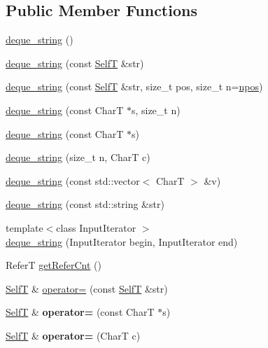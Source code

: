 \subsection*{Public Member Functions}
\begin{CompactItemize}
\item 
\hyperlink{classdeque__string_58a95023c19819f6bbc152a5a764be24}{deque\_\-string} ()
\item 
\hyperlink{classdeque__string_370593eb79336a2b06b0110eb6341807}{deque\_\-string} (const \hyperlink{classdeque__string}{SelfT} \&str)
\item 
\hyperlink{classdeque__string_bdf7279246355a4f6f20fa2f977ea581}{deque\_\-string} (const \hyperlink{classdeque__string}{SelfT} \&str, size\_\-t pos, size\_\-t n=\hyperlink{classdeque__string_b2a5692bbdd473486ce93df0cadd2540}{npos})
\item 
\hyperlink{classdeque__string_8dc178199327b360d1c7e437ab872421}{deque\_\-string} (const CharT $\ast$s, size\_\-t n)
\item 
\hyperlink{classdeque__string_6f787b1cd7c34cc81aa9c9e32e7558ce}{deque\_\-string} (const CharT $\ast$s)
\item 
\hyperlink{classdeque__string_f57f53bfcc45461c28703b910b9f2fc4}{deque\_\-string} (size\_\-t n, CharT c)
\item 
\hyperlink{classdeque__string_333a103558350fad1dd0083f18c7cdbb}{deque\_\-string} (const std::vector$<$ CharT $>$ \&v)
\item 
\hyperlink{classdeque__string_e7bf748ddc74ec3fab236086a9087dce}{deque\_\-string} (const std::string \&str)
\item 
{\footnotesize template$<$class InputIterator $>$ }\\\hyperlink{classdeque__string_b76b1f9d84f09742d21593ae38d7e3c2}{deque\_\-string} (InputIterator begin, InputIterator end)
\item 
ReferT \hyperlink{classdeque__string_fa855547712290b460b7ea219fa085c0}{getReferCnt} ()
\item 
\hyperlink{classdeque__string}{SelfT} \& \hyperlink{classdeque__string_dc6562d086b15033ba12303fbe9bc634}{operator=} (const \hyperlink{classdeque__string}{SelfT} \&str)
\item 
\hypertarget{classdeque__string_f91bf6b122d7d9eec3623a5a50229e0f}{
\hyperlink{classdeque__string}{SelfT} \& \textbf{operator=} (const CharT $\ast$s)}
\label{classdeque__string_f91bf6b122d7d9eec3623a5a50229e0f}

\item 
\hypertarget{classdeque__string_1e3e00077693cce55a73b32c8bc09281}{
\hyperlink{classdeque__string}{SelfT} \& \textbf{operator=} (CharT c)}
\label{classdeque__string_1e3e00077693cce55a73b32c8bc09281}


\end{CompactItemize}
